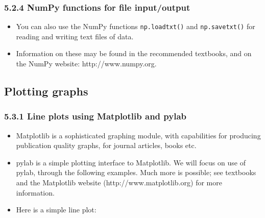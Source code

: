 \documentclass[10pt]{article}
\providecommand{\tightlist}{%
      \setlength{\itemsep}{0pt}\setlength{\parskip}{0pt}}
\begin{document}
    \hypertarget{numpy-functions-for-file-inputoutput}{%
\subsubsection*{5.2.4 NumPy functions for file
input/output}\label{numpy-functions-for-file-inputoutput}}

\begin{itemize}
\tightlist
\item
  You can also use the NumPy functions \texttt{np.loadtxt()} and
  \texttt{np.savetxt()} for reading and writing text files of data.
\item
  Information on these may be found in the recommended textbooks, and on
  the NumPy website: http://www.numpy.org.
\end{itemize}

    \hypertarget{plotting-graphs}{%
\subsection{Plotting graphs}\label{plotting-graphs}}

\hypertarget{line-plots-using-matplotlib-and-pylab}{%
\subsubsection*{5.3.1 Line plots using Matplotlib and
pylab}\label{line-plots-using-matplotlib-and-pylab}}

\begin{itemize}
\tightlist
\item
  Matplotlib is a sophisticated graphing module, with capabilities for
  producing publication quality graphs, for journal articles, books etc.
\item
  pylab is a simple plotting interface to Matplotlib. We will focus on
  use of pylab, through the following examples. Much more is possible;
  see textbooks and the Matplotlib website (http://www.matplotlib.org)
  for more information.
\item
  Here is a simple line plot:
\end{itemize}
\end{document}
